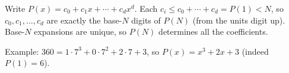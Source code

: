 Write $P(x)=c_0+c_1x+\cdots+c_dx^d$. Each $c_i\le c_0+\cdots+c_d=P(1)<N$, so $c_0,c_1,\dots,c_d$ are exactly the base-$N$ digits of $P(N)$ (from the units digit up). Base-$N$ expansions are unique, so $P(N)$ determines all the coefficients.

Example: $360=1\cdot7^3+0\cdot7^2+2\cdot7+3$, so $P(x)=\boxed{x^3+2x+3}$ (indeed $P(1)=6$).
